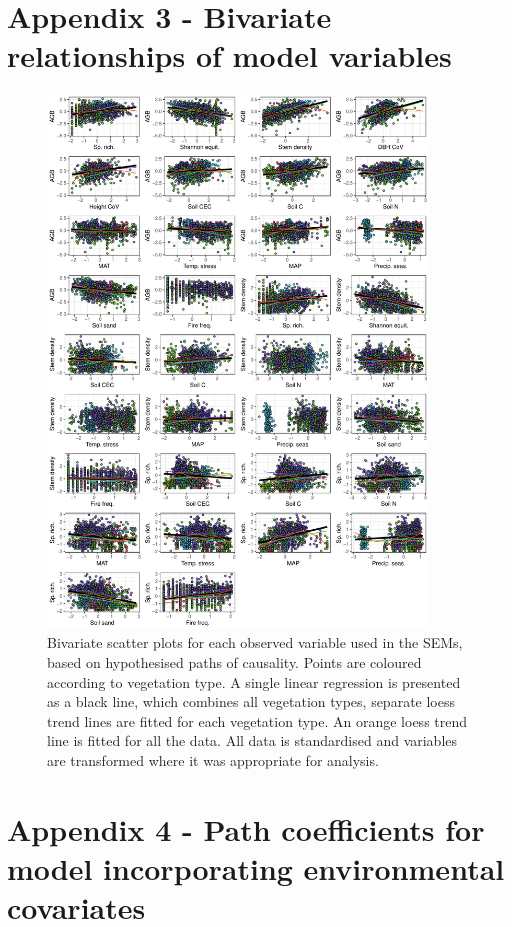 \documentclass[11pt,a4paper]{article}
\begin{document}


\section{Appendix 3 - Bivariate relationships of model variables} \label{appendixc}

\begin{figure}[H]
\centering
	\includegraphics[width=0.9\textwidth]{bivar_lm}
	\caption{Bivariate scatter plots for each observed variable used in the SEMs, based on hypothesised paths of causality. Points are coloured according to vegetation type. A single linear regression is presented as a black line, which combines all vegetation types, separate loess trend lines are fitted for each vegetation type. An orange loess trend line is fitted for all the data. All data is standardised and variables are transformed where it was appropriate for analysis.}
	\label{bivar_lm}
\end{figure}

\section{Appendix 4 - Path coefficients for model incorporating environmental covariates} \label{appendixd}
\end{document}
